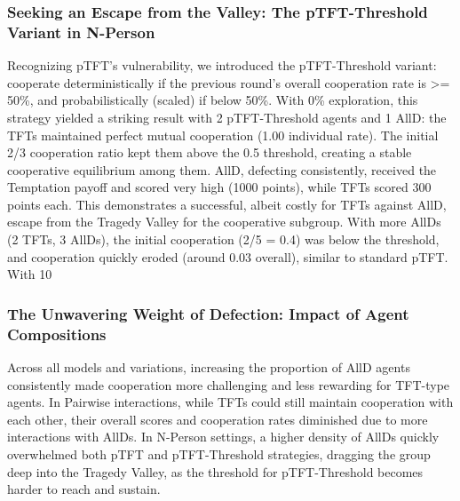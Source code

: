 \documentclass[]{llncs} %
\begin{document}
\subsubsection{Seeking an Escape from the Valley: The pTFT-Threshold Variant in N-Person}
Recognizing pTFT's vulnerability, we introduced the pTFT-Threshold variant: cooperate deterministically if the previous round's overall cooperation rate is >= 50\%, and probabilistically (scaled) if below 50\%.
With 0\% exploration, this strategy yielded a striking result with 2 pTFT-Threshold agents and 1 AllD: the TFTs maintained perfect mutual cooperation (1.00 individual rate). The initial 2/3 cooperation ratio kept them above the 0.5 threshold, creating a stable cooperative equilibrium among them. AllD, defecting consistently, received the Temptation payoff and scored very high (1000 points), while TFTs scored 300 points each. This demonstrates a successful, albeit costly for TFTs against AllD, escape from the Tragedy Valley for the cooperative subgroup. With more AllDs (2 TFTs, 3 AllDs), the initial cooperation (2/5 = 0.4) was below the threshold, and cooperation quickly eroded (around 0.03 overall), similar to standard pTFT.
With 10%

\subsubsection{The Unwavering Weight of Defection: Impact of Agent Compositions}
Across all models and variations, increasing the proportion of AllD agents consistently made cooperation more challenging and less rewarding for TFT-type agents. In Pairwise interactions, while TFTs could still maintain cooperation with each other, their overall scores and cooperation rates diminished due to more interactions with AllDs. In N-Person settings, a higher density of AllDs quickly overwhelmed both pTFT and pTFT-Threshold strategies, dragging the group deep into the Tragedy Valley, as the threshold for pTFT-Threshold becomes harder to reach and sustain.
\end{document}
